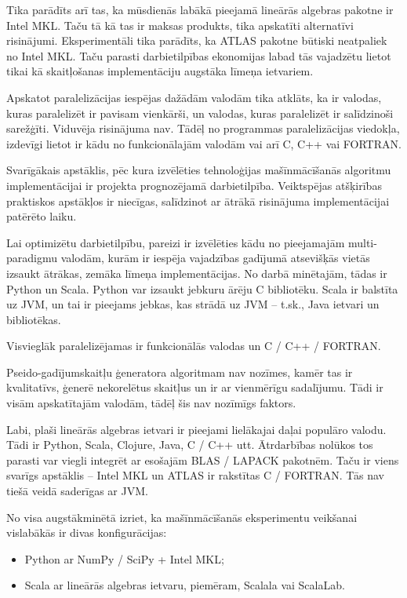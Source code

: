 \documentclass{ludis}
\begin{document}
Tika parādīts arī tas, ka mūsdienās labākā pieejamā lineārās algebras pakotne ir Intel MKL. Taču tā kā tas ir maksas produkts, tika apskatīti alternatīvi risinājumi. Eksperimentāli tika parādīts, ka ATLAS pakotne būtiski neatpaliek no Intel MKL. Taču parasti darbietilpības ekonomijas labad tās vajadzētu lietot tikai kā skaitļošanas implementāciju augstāka līmeņa ietvariem.

Apskatot paralelizācijas iespējas dažādām valodām tika atklāts, ka ir valodas, kuras paralelizēt ir pavisam vienkārši, un valodas, kuras paralelizēt ir salīdzinoši sarežģīti. Viduvēja risinājuma nav. Tādēļ no programmas paralelizācijas viedokļa, izdevīgi lietot ir kādu no funkcionālajām valodām vai arī C, C++ vai FORTRAN.

Svarīgākais apstāklis, pēc kura izvēlēties tehnoloģijas mašīnmācīšanās algoritmu implementācijai ir projekta prognozējamā darbietilpība. Veiktspējas atšķirības praktiskos apstākļos ir niecīgas, salīdzinot ar ātrākā risinājuma implementācijai patērēto laiku.

Lai optimizētu darbietilpību, pareizi ir izvēlēties kādu no pieejamajām multi-paradigmu valodām, kurām ir iespēja vajadzības gadījumā atsevišķās vietās izsaukt ātrākas, zemāka līmeņa implementācijas. No darbā minētajām, tādas ir Python un Scala. Python var izsaukt jebkuru ārēju C bibliotēku. Scala ir balstīta uz JVM, un tai ir pieejams jebkas, kas strādā uz JVM -- t.sk., Java ietvari un bibliotēkas.

Visvieglāk paralelizējamas ir funkcionālās valodas un C / C++ / FORTRAN.

Pseido-gadījumskaitļu ģeneratora algoritmam nav nozīmes, kamēr tas ir kvalitatīvs, ģenerē nekorelētus skaitļus un ir ar vienmērīgu sadalījumu. Tādi ir visām apskatītajām valodām, tādēļ šis nav nozīmīgs faktors.

Labi, plaši lineārās algebras ietvari ir pieejami lielākajai daļai populāro valodu. Tādi ir Python, Scala, Clojure, Java, C / C++ utt. Ātrdarbības nolūkos tos parasti var viegli integrēt ar esošajām BLAS / LAPACK pakotnēm. Taču ir viens svarīgs apstāklis -- Intel MKL un ATLAS ir rakstītas C / FORTRAN. Tās nav tiešā veidā saderīgas ar JVM. 

No visa augstākminētā izriet, ka mašīnmācīšanās eksperimentu veikšanai vislabākās ir divas konfigurācijas:
\begin{itemize}
\item Python ar NumPy / SciPy + Intel MKL;
\item Scala ar lineārās algebras ietvaru, piemēram, Scalala vai ScalaLab.
\end{itemize}

\end{document}
